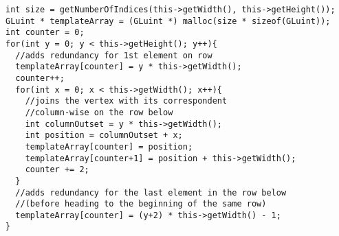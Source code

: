 \documentclass[11pt]{article}
\begin{document}
\begin{verbatim}
int size = getNumberOfIndices(this->getWidth(), this->getHeight());
GLuint * templateArray = (GLuint *) malloc(size * sizeof(GLuint));
int counter = 0;
for(int y = 0; y < this->getHeight(); y++){
  //adds redundancy for 1st element on row
  templateArray[counter] = y * this->getWidth();
  counter++;
  for(int x = 0; x < this->getWidth(); x++){
    //joins the vertex with its correspondent
    //column-wise on the row below
    int columnOutset = y * this->getWidth();
    int position = columnOutset + x;
    templateArray[counter] = position;
    templateArray[counter+1] = position + this->getWidth();
    counter += 2;
  }
  //adds redundancy for the last element in the row below
  //(before heading to the beginning of the same row)
  templateArray[counter] = (y+2) * this->getWidth() - 1;
}
\end{verbatim}
\end{document}
